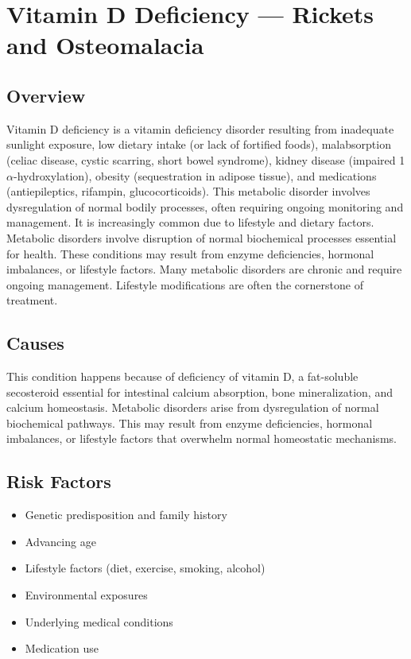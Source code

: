 \chapter{Vitamin D Deficiency --- Rickets and Osteomalacia}
\label{sec:Vitamin D Deficiency}

\section{Overview}
Vitamin D deficiency is a vitamin deficiency disorder resulting from inadequate sunlight exposure, low dietary intake (or lack of fortified foods), malabsorption (celiac disease, cystic scarring, short bowel syndrome), kidney disease (impaired 1$\alpha$-hydroxylation), obesity (sequestration in adipose tissue), and medications (antiepileptics, rifampin, glucocorticoids). This metabolic disorder involves dysregulation of normal bodily processes, often requiring ongoing monitoring and management. It is increasingly common due to lifestyle and dietary factors. Metabolic disorders involve disruption of normal biochemical processes essential for health. These conditions may result from enzyme deficiencies, hormonal imbalances, or lifestyle factors. Many metabolic disorders are chronic and require ongoing management. Lifestyle modifications are often the cornerstone of treatment.
\section{Causes}
This condition happens because of deficiency of vitamin D, a fat-soluble secosteroid essential for intestinal calcium absorption, bone mineralization, and calcium homeostasis. Metabolic disorders arise from dysregulation of normal biochemical pathways. This may result from enzyme deficiencies, hormonal imbalances, or lifestyle factors that overwhelm normal homeostatic mechanisms.   
\section{Risk Factors}
\begin{itemize}[noitemsep]
  \item Genetic predisposition and family history
  \item Advancing age
  \item Lifestyle factors (diet, exercise, smoking, alcohol)
  \item Environmental exposures
  \item Underlying medical conditions
  \item Medication use
\end{itemize}
